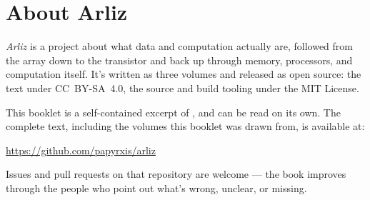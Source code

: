 \chapter*{About Arliz}

\textit{Arliz} is a project about what data and computation actually
are, followed from the array down to the transistor and back up
through memory, processors, and computation itself. It's written as
three volumes and released as open source: the text under
CC~BY-SA~4.0, the source and build tooling under the MIT License.

This booklet is a self-contained excerpt of \BookletSubtitle, and can
be read on its own. The complete text, including the volumes this
booklet was drawn from, is available at:

\begin{center}
  \url{https://github.com/papyrxis/arliz}
\end{center}

Issues and pull requests on that repository are welcome --- the book
improves through the people who point out what's wrong, unclear, or
missing.